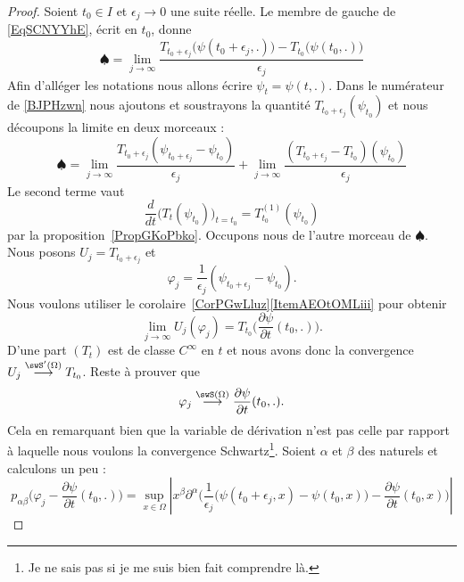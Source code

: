 \begin{proof}
	Soient \( t_0\in I\) et \( \epsilon_j\to 0\) une suite réelle. Le membre de gauche de \eqref{EqSCNYYhE}, écrit en \( t_0\), donne
	\begin{equation}    \label{BJPHzwn}
		\spadesuit=\lim_{j\to \infty} \frac{ T_{t_0+\epsilon_j}\big( \psi(t_0+\epsilon_j,.) \big)-T_{t_0}\big( \psi(t_0,.) \big) }{ \epsilon_j }
	\end{equation}
	Afin d'alléger les notations nous allons écrire \( \psi_t=\psi(t,.)\). Dans le numérateur de \eqref{BJPHzwn} nous ajoutons et soustrayons la quantité \( T_{t_0+\epsilon_j}(\psi_{t_0})\) et nous découpons la limite en deux morceaux :
	\begin{equation}
		\spadesuit=\lim_{j\to \infty} \frac{ T_{t_0+\epsilon_j}(\psi_{t_0+\epsilon_j}-\psi_{t_0}) }{ \epsilon_j }+\lim_{j\to \infty} \frac{ (T_{t_0+\epsilon_j}-T_{t_0})(\psi_{t_0}) }{ \epsilon_j }
	\end{equation}
	Le second terme vaut
	\begin{equation}
		\frac{ d }{ dt }\Big( T_t(\psi_{t_0}) \Big)_{t=t_0}=T_{t_0}^{(1)}(\psi_{t_0})
	\end{equation}
	par la proposition~\ref{PropGKoPbko}. Occupons nous de l'autre morceau de \( \spadesuit\). Nous posons \( U_j=T_{t_0+\epsilon_j}\) et
	\begin{equation}
		\varphi_j=\frac{1}{ \epsilon_j }(\psi_{t_0+\epsilon_j}-\psi_{t_0}).
	\end{equation}
	Nous voulons utiliser le corolaire~\ref{CorPGwLluz}\ref{ItemAEOtOMLiii} pour obtenir
	\begin{equation}
		\lim_{j\to \infty} U_j(\varphi_j)=T_{t_0}\Big( \frac{ \partial \psi }{ \partial t }(t_0,.) \Big).
	\end{equation}
	D'une part \( (T_t)\) est de classe \(  C^{\infty}\) en \( t\) et nous avons donc la convergence \( U_j\stackrel{\swS'(\Omega)}{\longrightarrow}T_{t_0}\). Reste à prouver que
	\begin{equation}
		\varphi_j\stackrel{\swS(\Omega)}{\longrightarrow}\frac{ \partial \psi }{ \partial t }(t_0,.).
	\end{equation}
	Cela en remarquant bien que la variable de dérivation n'est pas celle par rapport à laquelle nous voulons la convergence Schwartz\footnote{Je ne sais pas si je me suis bien fait comprendre là.}. Soient \( \alpha\) et \( \beta\) des naturels et calculons un peu :
	\begin{equation}    \label{EqEBUYDRA}
		p_{\alpha\beta}\big( \varphi_j-\frac{ \partial \psi }{ \partial t }(t_0,.) \big)=\sup_{x\in\Omega}\left| x^{\beta}\partial^{\alpha}\Big( \frac{1}{ \epsilon_j }\big(\psi(t_0+\epsilon_j,x)-\psi(t_0,x)\big) -\frac{ \partial \psi }{ \partial t }(t_0,x) \Big)\right|

\end{equation}
\end{proof}
